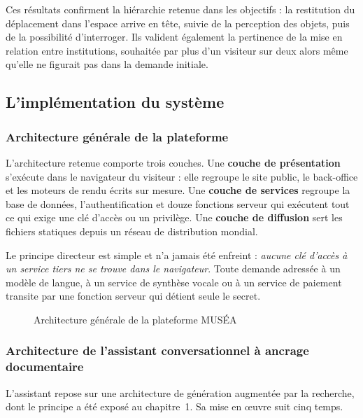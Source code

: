 Ces résultats confirment la hiérarchie retenue dans les objectifs : la
restitution du déplacement dans l'espace arrive en tête, suivie de la perception
des objets, puis de la possibilité d'interroger. Ils valident également la
pertinence de la mise en relation entre institutions, souhaitée par plus d'un
visiteur sur deux alors même qu'elle ne figurait pas dans la demande initiale.

\subsection{L'implémentation du système}
\label{sec:implementation}

\subsubsection{Architecture générale de la plateforme}

L'architecture retenue comporte trois couches. Une \textbf{couche de
présentation} s'exécute dans le navigateur du visiteur : elle regroupe le site
public, le back-office et les moteurs de rendu écrits sur mesure. Une
\textbf{couche de services} regroupe la base de données, l'authentification et
douze fonctions serveur qui exécutent tout ce qui exige une clé d'accès ou un
privilège. Une \textbf{couche de diffusion} sert les fichiers statiques depuis
un réseau de distribution mondial.

Le principe directeur est simple et n'a jamais été enfreint : \emph{aucune clé
d'accès à un service tiers ne se trouve dans le navigateur}. Toute demande
adressée à un modèle de langue, à un service de synthèse vocale ou à un service
de paiement transite par une fonction serveur qui détient seule le secret.

\begin{figure}[!ht]
\centering
{}
\caption{Architecture générale de la plateforme MUSÉA}
\label{fig:archi}
\end{figure}

\subsubsection{Architecture de l'assistant conversationnel à ancrage documentaire}

L'assistant repose sur une architecture de génération augmentée par la
recherche, dont le principe a été exposé au chapitre~1. Sa mise en œuvre suit
cinq temps.

